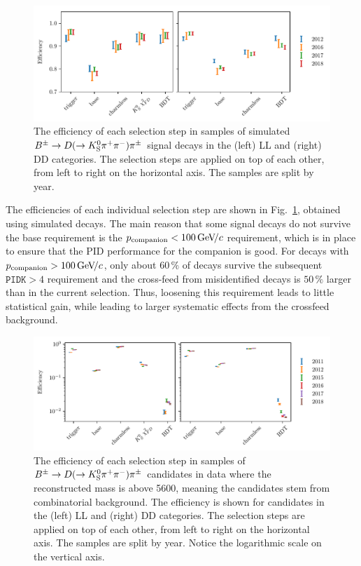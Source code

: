 \begin{figure}[tp]
    \centering
    \includegraphics[width=0.98\columnwidth]{figures/analysis//relative_cutflow_signal_thesis.pdf}
    \caption{The efficiency of each selection step in samples of simulated ${{{B}^\pm}\rightarrow{\ensuremath{D}}(\rightarrow{\ensuremath{{K}^0_{\mathrm{S}}}}{\ensuremath{{\pi}^+}}{\ensuremath{{\pi}^-}}){{\pi}^\pm}}$ signal decays in the (left) LL and (right) DD categories. The selection steps are applied on top of each other, from left to right on the horizontal axis. The samples are split by year. }
    \label{fig:sig_rel_cutflow}
\end{figure}



The efficiencies of each individual selection step are shown in Fig.~\ref{fig:sig_rel_cutflow}, obtained using simulated \BtoDpi decays. The main reason that some signal decays do not survive the base requirement is the ${p_\mathrm{companion}<100\text{\,Ge\kern -0.1em V\!/}c}$ requirement, which is in place to ensure that the PID performance for the companion is good. For decays with $p_\mathrm{companion}>100\text{\,Ge\kern -0.1em V\!/}c$, only about $60\,\%$ of \BtoDK decays survive the subsequent $\texttt{PIDK}>4$ requirement and the cross-feed from misidentified \BtoDpi decays is $50\,\%$ larger than in the current selection. Thus, loosening this requirement leads to little statistical gain, while leading to larger systematic effects from the crossfeed background.


\begin{figure}[tp]
    \centering
    \includegraphics[width=0.98\columnwidth]{figures/analysis/relative_cutflow_combinatorial_thesis.pdf}
    \caption{
    The efficiency of each selection step in samples of ${{{B}^\pm}\rightarrow{\ensuremath{D}}(\rightarrow{\ensuremath{{K}^0_{\mathrm{S}}}}{\ensuremath{{\pi}^+}}{\ensuremath{{\pi}^-}}){{\pi}^\pm}}$ candidates in data where the reconstructed \B mass is above 5600\mevcc, meaning the candidates stem from combinatorial background. The efficiency is shown for candidates in the (left) LL and (right) DD categories. The selection steps are applied on top of each other, from left to right on the horizontal axis. The samples are split by year. Notice the logarithmic scale on the vertical axis.}
    \label{fig:comb_rel_cutflow}
\end{figure}

